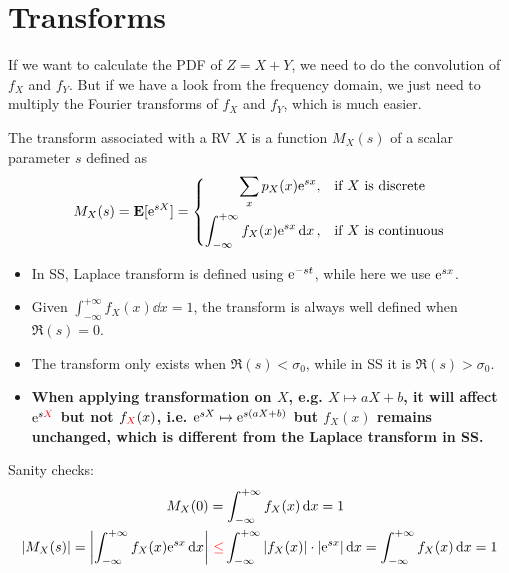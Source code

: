 \documentclass[device=normal, lang=en]{elegantbook}
\numberwithin{equation}{section}
\begin{document}
\section{Transforms}
If we want to calculate the PDF of $Z = X + Y$, we need to do the convolution of $f_{X}$ and $f_{Y}$. But if we have a look from the frequency domain, we just need to multiply the Fourier transforms of $f_{X}$ and $f_{Y}$, which is much easier.
\begin{definition}
    The transform associated with a RV $X$ is a function $M_{X}(s)$ of a scalar parameter $s$ defined as
    \begin{equation}
        M_{X}(s) = \mathbf{E}[\mathrm{e}^{sX}] = \left\{\begin{aligned}
            \sum_{x} p_{X}(x) \mathrm{e}^{sx}, \quad &\text{if } X \text{ is discrete} \\
            \int_{-\infty}^{+\infty} f_{X}(x) \mathrm{e}^{sx} \dd{x}, \quad &\text{if } X \text{ is continuous}
        \end{aligned}\right.
    \end{equation}
\end{definition}
\begin{remark}
    \begin{itemize}
        \item In SS, Laplace transform is defined using $\mathrm{e}^{-st}$, while here we use $\mathrm{e}^{sx}$.
        \item Given $\int_{-\infty}^{+\infty} f_{X}(x) \dd{x} = 1$, the transform is always well defined when $\Re(s) = 0$.
        \item The transform only exists when $\Re(s) < \sigma_0$, while in SS it is $\Re(s) > \sigma_0$.
        \item \textbf{When applying transformation on $X$, e.g. $X \mapsto aX + b$, it will affect $\mathrm{e}^{s\textcolor{red}{X}}$ but not $f_{\textcolor{red}{X}}(x)$, i.e. $\mathrm{e}^{sX} \mapsto \mathrm{e}^{s(aX + b)}$ but $f_{X}(x)$ remains unchanged, which is different from the Laplace transform in SS.}
    \end{itemize}
\end{remark}
\noindent Sanity checks:
    \begin{equation}
    \begin{aligned}
        M_{X}(0) &= \int_{-\infty}^{+\infty} f_{X}(x) \dd{x} = 1 \\ 
        \abs{M_{X}(s)} = \abs{\int_{-\infty}^{+\infty} f_{X}(x) \mathrm{e}^{sx} \dd{x}} &\textcolor{red}{~\leq} \int_{-\infty}^{+\infty} \abs{f_{X}(x)} \cdot \abs{\mathrm{e}^{sx}} \dd{x} = \int_{-\infty}^{+\infty} f_{X}(x) \dd{x} = 1
    \end{aligned}
    \end{equation}
\end{document}
